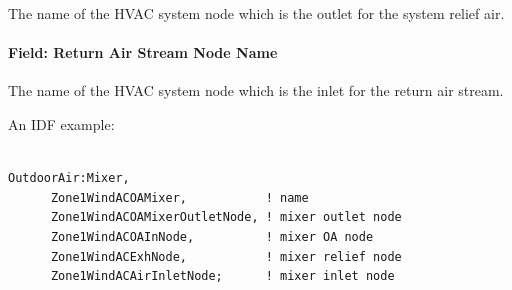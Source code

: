 The name of the HVAC system node which is the outlet for the system relief air.

\paragraph{Field: Return Air Stream Node Name}\label{field-return-air-stream-node-name}

The name of the HVAC system node which is the inlet for the return air stream.

An IDF example:

\begin{lstlisting}

OutdoorAir:Mixer,
      Zone1WindACOAMixer,           ! name
      Zone1WindACOAMixerOutletNode, ! mixer outlet node
      Zone1WindACOAInNode,          ! mixer OA node
      Zone1WindACExhNode,           ! mixer relief node
      Zone1WindACAirInletNode;      ! mixer inlet node
\end{lstlisting}
